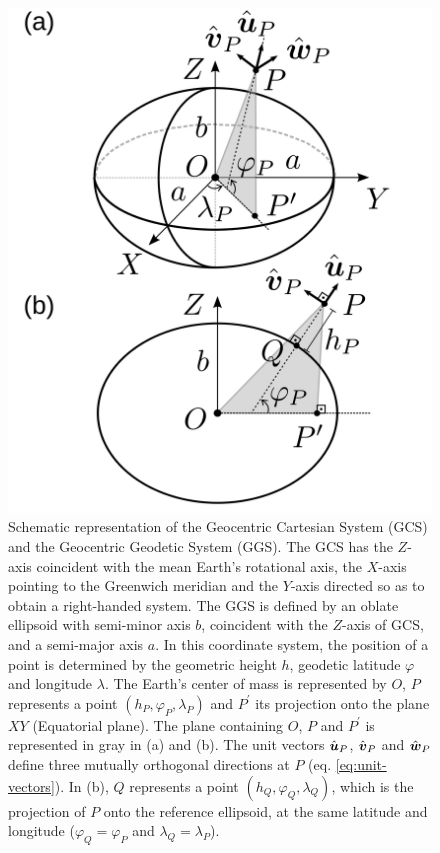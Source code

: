 \documentclass[extra]{gji}
\begin{document}
\begin{figure}
    \includegraphics{figures/cartesian-geodetic-systems.png}
    \caption{Schematic representation of the Geocentric Cartesian System (GCS) and the Geocentric Geodetic System (GGS). The GCS has the $Z$-axis coincident with the mean Earth's rotational axis,
    the $X$-axis pointing to the Greenwich meridian and the $Y$-axis
    directed so as to obtain a right-handed system. The GGS is      defined by an oblate ellipsoid with semi-minor axis $b$, 
    coincident with the $Z$-axis of GCS, and a semi-major
    axis $a$. In this coordinate system, the position of a point is
    determined by the geometric height $h$, geodetic latitude 
    $\varphi$ and longitude $\lambda$. 
    The Earth's center of mass is represented 
    by $O$, $P$ represents a point $(h_{P}, \varphi_{P}, \lambda_{P})$ and $P^{\prime}$ its projection onto the plane $XY$ 
    (Equatorial plane). The plane containing $O$, $P$ and 
    $P^{\prime}$ is represented in gray in (a) and (b). 
    The unit vectors $\hat{\mitbf{u}}_{P}$, $\hat{\mitbf{v}}_{P}$ and 
    $\hat{\mitbf{w}}_{P}$ define three mutually orthogonal 
    directions at $P$ (eq. \ref{eq:unit-vectors}).
    In (b), $Q$ represents a point $(h_{Q}, \varphi_{Q}, \lambda_{Q})$,
    which is the projection of $P$ onto the reference ellipsoid, at
    the same latitude and longitude ($\varphi_{Q} = \varphi_{P}$ and $\lambda_{Q} = \lambda_{P}$).}
  \label{fig:GCS-GGS}
\end{figure}
\end{document}

